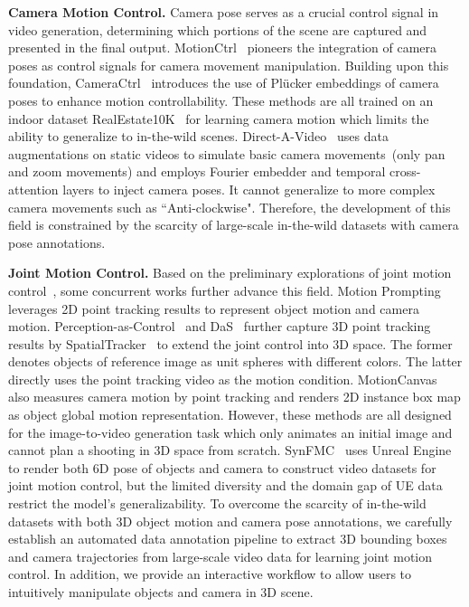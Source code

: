 \noindent\textbf{Camera Motion Control.} Camera pose serves as a crucial control signal in video generation, determining which portions of the scene are captured and presented in the final output. MotionCtrl~\cite{MotionCtrl} pioneers the integration of camera poses as control signals for camera movement manipulation. Building upon this foundation, CameraCtrl~\cite{cameractrl} introduces the use of Plücker embeddings of camera poses to enhance motion controllability. These methods are all trained on an indoor dataset RealEstate10K~\cite{realestate10k} for learning camera motion which limits the ability to generalize to in-the-wild scenes. Direct-A-Video~\cite{yang2024direct} uses data augmentations on static videos to simulate basic camera movements~(only pan and zoom movements) and employs Fourier embedder and temporal cross-attention layers to inject camera poses. It cannot generalize to more complex camera movements such as ``Anti-clockwise". Therefore, the development of this field is constrained by the scarcity of large-scale in-the-wild datasets with camera pose annotations.



\noindent\textbf{Joint Motion Control.} Based on the preliminary explorations of joint motion control~\cite{MotionCtrl,yang2024direct}, some concurrent works further advance this field. Motion Prompting~\cite{geng2024motion} leverages 2D point tracking results to represent object motion and camera motion. Perception-as-Control~\cite{chen2025perception} and DaS~\cite{shader} further capture 3D point tracking results by SpatialTracker~\cite{SpatialTracker} to extend the joint control into 3D space. The former denotes objects of reference image as unit spheres with different colors. The latter directly uses the point tracking video as the motion condition. MotionCanvas~\cite{motioncanvas}
also measures camera motion by point tracking and renders 2D instance box map as object global motion representation. However, these methods are all designed for the image-to-video generation task which only animates an initial image and cannot plan a shooting in 3D space from scratch. SynFMC~\cite{shuai2025free} uses Unreal Engine to render both 6D pose of objects and camera to construct video datasets for joint motion control, but the limited diversity and the domain gap of UE data restrict the model's generalizability. To overcome the scarcity of in-the-wild datasets with both 3D object motion and camera pose annotations, we carefully establish an automated data annotation pipeline to extract 3D bounding boxes and camera trajectories from large-scale video data for learning joint motion control. In addition, we provide an interactive workflow to allow users to intuitively manipulate objects and camera in 3D scene.

